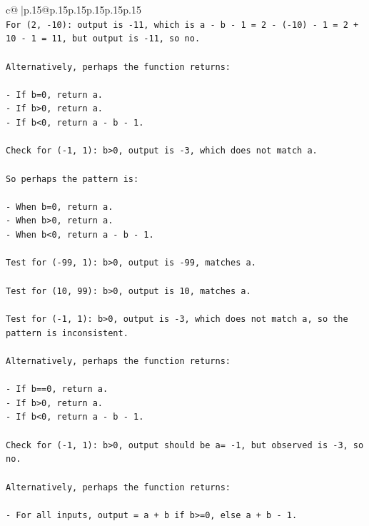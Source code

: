 \documentclass{article}
\begin{document}
{\begin{supertabular}{c@{$\;$}|p{.15\linewidth}@{}p{.15\linewidth}p{.15\linewidth}p{.15\linewidth}p{.15\linewidth}p{.15\linewidth}}
{{{\\ 
\texttt{For (2, {-}10): output is {-}11, which is a {-} b {-} 1 = 2 {-} ({-}10) {-} 1 = 2 + 10 {-} 1 = 11, but output is {-}11, so no.} \\
\\ 
\texttt{Alternatively, perhaps the function returns:} \\
\\ 
\texttt{{-} If b=0, return a.} \\
\texttt{{-} If b>0, return a.} \\
\texttt{{-} If b<0, return a {-} b {-} 1.} \\
\\ 
\texttt{Check for ({-}1, 1): b>0, output is {-}3, which does not match a.} \\
\\ 
\texttt{So perhaps the pattern is:} \\
\\ 
\texttt{{-} When b=0, return a.} \\
\texttt{{-} When b>0, return a.} \\
\texttt{{-} When b<0, return a {-} b {-} 1.} \\
\\ 
\texttt{Test for ({-}99, 1): b>0, output is {-}99, matches a.} \\
\\ 
\texttt{Test for (10, 99): b>0, output is 10, matches a.} \\
\\ 
\texttt{Test for ({-}1, 1): b>0, output is {-}3, which does not match a, so the pattern is inconsistent.} \\
\\ 
\texttt{Alternatively, perhaps the function returns:} \\
\\ 
\texttt{{-} If b==0, return a.} \\
\texttt{{-} If b>0, return a.} \\
\texttt{{-} If b<0, return a {-} b {-} 1.} \\
\\ 
\texttt{Check for ({-}1, 1): b>0, output should be a= {-}1, but observed is {-}3, so no.} \\
\\ 
\texttt{Alternatively, perhaps the function returns:} \\
\\ 
\texttt{{-} For all inputs, output = a + b if b>=0, else a + b {-} 1.} \\
\\ 
}}}
\end{supertabular}}
\end{document}
